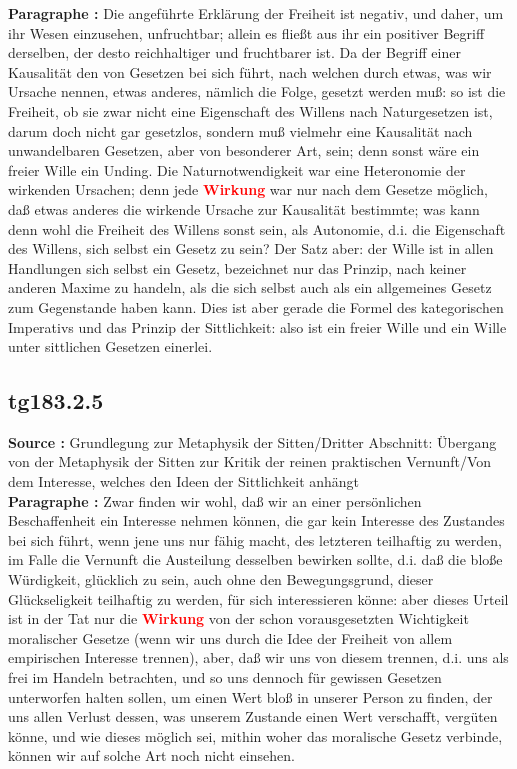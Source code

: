\documentclass[a4paper,12pt,twoside]{book}
\newcommand{\match}[1]{\textcolor{red}{\textbf{#1}}}
\begin{document}
	\noindent\textbf{Paragraphe : }Die angeführte Erklärung der Freiheit ist negativ, und daher, um ihr Wesen einzusehen, unfruchtbar; allein es fließt aus ihr ein positiver Begriff derselben, der desto reichhaltiger und fruchtbarer ist. Da der Begriff einer Kausalität den von Gesetzen bei sich führt, nach welchen durch etwas, was wir Ursache nennen, etwas anderes, nämlich die Folge, gesetzt werden muß: so ist die Freiheit, ob sie zwar nicht eine Eigenschaft des Willens nach Naturgesetzen ist, darum doch nicht gar gesetzlos, sondern muß vielmehr eine Kausalität nach unwandelbaren Gesetzen, aber von besonderer Art, sein; denn sonst wäre ein freier Wille ein Unding. Die Naturnotwendigkeit war eine Heteronomie der wirkenden Ursachen; denn jede \match{Wirkung} war nur nach dem Gesetze möglich, daß etwas anderes die wirkende Ursache zur Kausalität bestimmte; was kann denn wohl die Freiheit des Willens sonst sein, als Autonomie, d.i. die Eigenschaft des Willens, sich selbst ein Gesetz zu sein? Der Satz aber: der Wille ist in allen Handlungen sich selbst ein Gesetz, bezeichnet nur das Prinzip, nach keiner anderen Maxime zu handeln, als die sich selbst auch als ein allgemeines Gesetz zum Gegenstande haben kann. Dies ist aber gerade die Formel des kategorischen Imperativs und das Prinzip der Sittlichkeit:  also ist ein freier Wille und ein Wille unter sittlichen Gesetzen einerlei. 
	
	\subsection*{tg183.2.5} 
	\textbf{Source : }Grundlegung zur Metaphysik der Sitten/Dritter Abschnitt: Übergang von der Metaphysik der Sitten zur Kritik der reinen praktischen Vernunft/Von dem Interesse, welches den Ideen der Sittlichkeit anhängt\\  
	
	\noindent\textbf{Paragraphe : }Zwar finden wir wohl, daß wir an einer persönlichen Beschaffenheit ein Interesse nehmen können, die gar kein Interesse des Zustandes bei sich führt, wenn jene uns nur fähig macht, des letzteren teilhaftig zu werden, im Falle die Vernunft die Austeilung desselben bewirken sollte, d.i. daß die bloße Würdigkeit, glücklich zu sein, auch ohne den Bewegungsgrund, dieser Glückseligkeit teilhaftig zu werden, für sich interessieren könne: aber dieses Urteil ist in der Tat nur die \match{Wirkung} von der schon vorausgesetzten Wichtigkeit moralischer Gesetze (wenn wir uns durch die Idee der Freiheit von allem empirischen Interesse trennen), aber, daß wir uns von diesem trennen, d.i. uns als frei im Handeln betrachten, und so uns dennoch für gewissen Gesetzen unterworfen halten sollen, um einen Wert bloß in unserer Person zu finden, der uns allen Verlust dessen, was unserem Zustande einen Wert verschafft, vergüten könne, und wie dieses möglich sei, mithin woher das moralische Gesetz verbinde, können wir auf solche Art noch nicht einsehen. 
	
\end{document}
